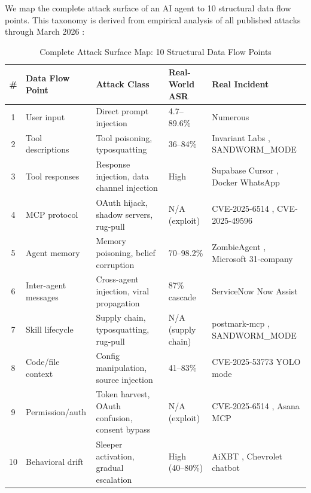 \documentclass[11pt,letterpaper]{article}
\begin{document}
We map the complete attack surface of an AI agent to 10 structural data flow points. This taxonomy is derived from empirical analysis of all published attacks through March 2026 \cite{kim2026,chhabra2025,promptkillchain,youraishell}:

\begin{table}[htbp]
\centering
\caption{Complete Attack Surface Map: 10 Structural Data Flow Points}
\label{tab:attacksurface}
\footnotesize
\begin{tabularx}{\textwidth}{clXlX}
\toprule
\textbf{\#} & \textbf{Data Flow Point} & \textbf{Attack Class} & \textbf{Real-World ASR} & \textbf{Real Incident} \\
\midrule
1 & User input & Direct prompt injection & 4.7--89.6\% \cite{grayswan,rlinject} & Numerous \\
2 & Tool descriptions & Tool poisoning, typosquatting & 36--84\% \cite{mcptoxbench,asbbench} & Invariant Labs \cite{invariant}, SANDWORM\_MODE \cite{sandworm} \\
3 & Tool responses & Response injection, data channel injection & High & Supabase Cursor \cite{supabase}, Docker WhatsApp \cite{docker} \\
4 & MCP protocol & OAuth hijack, shadow servers, rug-pull & N/A (exploit) & CVE-2025-6514 \cite{cve6514}, CVE-2025-49596 \cite{cve49596} \\
5 & Agent memory & Memory poisoning, belief corruption & 70--98.2\% \cite{minja} & ZombieAgent \cite{memorygraft}, Microsoft 31-company \cite{mspoison} \\
6 & Inter-agent messages & Cross-agent injection, viral propagation & 87\% cascade \cite{galileo} & ServiceNow Now Assist \cite{servicenow} \\
7 & Skill lifecycle & Supply chain, typosquatting, rug-pull & N/A (supply chain) & postmark-mcp \cite{postmark}, SANDWORM\_MODE \cite{sandworm} \\
8 & Code/file context & Config manipulation, source injection & 41--83\% \cite{aishell} & CVE-2025-53773 YOLO mode \cite{cve53773} \\
9 & Permission/auth & Token harvest, OAuth confusion, consent bypass & N/A (exploit) & CVE-2025-6514 \cite{cve6514}, Asana MCP \cite{asana} \\
10 & Behavioral drift & Sleeper activation, gradual escalation & High (40--80\%) \cite{memorygraft} & AiXBT \cite{aixbt}, Chevrolet chatbot \\
\bottomrule
\end{tabularx}
\end{table}
\end{document}
